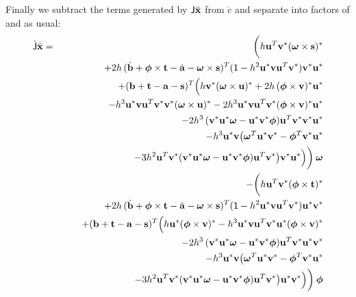 Finally we subtract the terms generated by $\m{J}\ddot{\ve{x}}$ from $\ddot{c}$ and separate
into factors of \ve{\omega} and \ve{\phi} as usual:
\begin{eqnarray}
\dot{\m{J}}\dot{\ve{x}} &=& \bigg(
        h\ve{u}^T\dual{\ve{v}}\dual{(\ve{\omega}\times\ve{s})} \\*&&\quad\quad +
        2h\,(\dot{\ve{b}} + \ve{\phi}\times\ve{t} - \dot{\ve{a}} - \ve{\omega}\times\ve{s})^T
        (\m{1} - h^2\dual{\ve{u}}\ve{v}\ve{u}^T\dual{\ve{v}}) \dual{\ve{v}}\dual{\ve{u}}
        \nonumber\\*&&\quad\quad
        +(\ve{b} + \ve{t} - \ve{a} - \ve{s})^T \Big(
        h\dual{\ve{v}}\dual{(\ve{\omega}\times\ve{u})}
        +2h\,\dual{(\ve{\phi}\times\ve{v})}\dual{\ve{u}} \nonumber\\*&&\quad\quad\quad\quad
        -h^3\dual{\ve{u}}\ve{v}\ve{u}^T\dual{\ve{v}}\dual{\ve{v}}\dual{(\ve{\omega}\times\ve{u})}
        -2h^3\dual{\ve{u}}\ve{v}\ve{u}^T\dual{\ve{v}}\dual{(\ve{\phi}\times\ve{v})}\dual{\ve{u}}
        \nonumber\\*&&\quad\quad\quad\quad
        -2h^3\,(\dual{\ve{v}}\dual{\ve{u}}\ve{\omega} - \dual{\ve{u}}\dual{\ve{v}}\ve{\phi})
        \ve{u}^T\dual{\ve{v}}\dual{\ve{v}}\dual{\ve{u}}
        \nonumber\\*&&\quad\quad\quad\quad
        -h^3 \dual{\ve{u}}\ve{v} \big(
        \ve{\omega}^T\dual{\ve{u}}\dual{\ve{v}} - \ve{\phi}^T\dual{\ve{v}}\dual{\ve{u}}
        \nonumber\\*&&\quad\quad\quad\quad\quad\quad
        -3h^2 \ve{u}^T\dual{\ve{v}}
        (\dual{\ve{v}}\dual{\ve{u}}\ve{\omega} - \dual{\ve{u}}\dual{\ve{v}}\ve{\phi})
        \ve{u}^T\dual{\ve{v}} \big) \dual{\ve{v}}\dual{\ve{u}} \Big) \bigg)\: \ve{\omega}
        \nonumber\\*&&
        -\bigg(
        h\ve{u}^T\dual{\ve{v}}\dual{(\ve{\phi}\times\ve{t})} \nonumber\\*&&\quad\quad
        +2h\,(\dot{\ve{b}} + \ve{\phi}\times\ve{t} - \dot{\ve{a}} - \ve{\omega}\times\ve{s})^T
        (\m{1} - h^2\dual{\ve{u}}\ve{v}\ve{u}^T\dual{\ve{v}}) \dual{\ve{u}}\dual{\ve{v}}
        \nonumber\\*&&\quad\quad
        +(\ve{b} + \ve{t} - \ve{a} - \ve{s})^T \Big(
        h\dual{\ve{u}}\dual{(\ve{\phi}\times\ve{v})}
        -h^3\dual{\ve{u}}\ve{v}\ve{u}^T\dual{\ve{v}}\dual{\ve{u}}\dual{(\ve{\phi}\times\ve{v})}
        \nonumber\\*&&\quad\quad\quad\quad
        -2h^3\,(\dual{\ve{v}}\dual{\ve{u}}\ve{\omega} - \dual{\ve{u}}\dual{\ve{v}}\ve{\phi})
        \ve{u}^T\dual{\ve{v}} \dual{\ve{u}}\dual{\ve{v}}
        \nonumber\\*&&\quad\quad\quad\quad
        -h^3 \dual{\ve{u}}\ve{v} \big(
        \ve{\omega}^T\dual{\ve{u}}\dual{\ve{v}} - \ve{\phi}^T\dual{\ve{v}}\dual{\ve{u}}
        \nonumber\\*&&\quad\quad\quad\quad\quad\quad
        -3h^2 \ve{u}^T\dual{\ve{v}}
        (\dual{\ve{v}}\dual{\ve{u}}\ve{\omega} - \dual{\ve{u}}\dual{\ve{v}}\ve{\phi})
        \ve{u}^T\dual{\ve{v}}
        \big) \dual{\ve{u}}\dual{\ve{v}} \Big) \bigg)\: \ve{\phi} \nonumber
\end{eqnarray}

